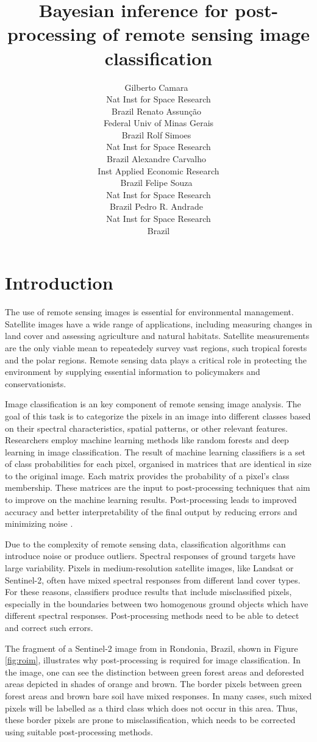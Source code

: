 \documentclass[
  shortnames]{jss}
\author{
Gilberto Camara~\orcidlink{0000-0002-3681-487X}\\Nat Inst for Space Research\\
Brazil \And Renato Assunção~\orcidlink{0000-0001-7442-9166}\\Federal Univ of Minas Gerais\\
Brazil \And Rolf Simoes~\orcidlink{0000-0003-0953-4132}\\Nat Inst for Space Research\\
Brazil \AND Alexandre Carvalho~\orcidlink{0000-0001-8762-5465}\\Inst Applied Economic Research\\
Brazil \And Felipe Souza~\orcidlink{0000-XXXXX}\\Nat Inst for Space Research\\
Brazil \And Pedro R. Andrade~\orcidlink{0000-0001-8675-4046}\\Nat Inst for Space Research\\
Brazil
}
\title{Bayesian inference for post-processing of remote sensing image classification}
\begin{document}
\newpage

\section{Introduction}\label{introduction}

The use of remote sensing images is essential for environmental management. Satellite images have a wide range of applications, including measuring changes in land cover and assessing agriculture and natural habitats. Satellite measurements are the only viable mean to repeatedely survey vast regions, such tropical forests and the polar regions. Remote sensing data plays a critical role in protecting the environment by supplying essential information to policymakers and conservationists.

Image classification is an key component of remote sensing image analysis. The goal of this task is to categorize the pixels in an image into different classes based on their spectral characteristics, spatial patterns, or other relevant features. Researchers employ machine learning methods like random forests \citep{Belgiu2016} and deep learning \citep{Ma2019} in image classification. The result of machine learning classifiers is a set of class probabilities for each pixel, organised in matrices that are identical in size to the original image. Each matrix provides the probability of a pixel's class membership. These matrices are the input to post-processing techniques that aim to improve on the machine learning results. Post-processing leads to improved accuracy and better interpretability of the final output by reducing errors and minimizing noise \citep{Schindler2012}.

Due to the complexity of remote sensing data, classification algorithms can introduce noise or produce outliers. Spectral responses of ground targets have large variability. Pixels in medium-resolution satellite images, like Landsat or Sentinel-2, often have mixed spectral responses from different land cover types. For these reasons, classifiers produce results that include misclassified pixels, especially in the boundaries between two homogenous ground objects which have different spectral responses. Post-processing methods need to be able to detect and correct such errors.

The fragment of a Sentinel-2 image from in Rondonia, Brazil, shown in Figure \ref{fig:roim}, illustrates why post-processing is required for image classification. In the image, one can see the distinction between green forest areas and deforested areas depicted in shades of orange and brown. The border pixels between green forest areas and brown bare soil have mixed responses. In many cases, such mixed pixels will be labelled as a third class which does not occur in this area. Thus, these border pixels are prone to misclassification, which needs to be corrected using suitable post-processing methods.
\end{document}
